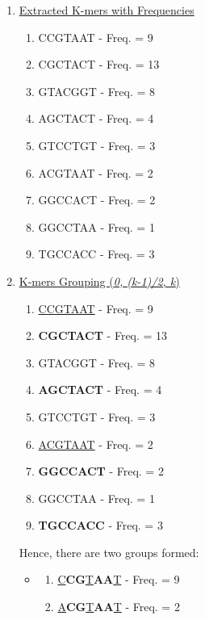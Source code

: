\documentclass[12pt,openany]{llncs}
\begin{document}
\begin{figure}
\vspace{0cm}
\begin{bordered}
\begin{enumerate}
	\item \underline{Extracted K-mers with Frequencies}
	\begin{enumerate}
		\item CCGTAAT - Freq. = 9
		\item CGCTACT - Freq. = 13
		\item GTACGGT - Freq. = 8
		\item AGCTACT - Freq. = 4
		\item GTCCTGT - Freq. = 3
		\item ACGTAAT - Freq. = 2
		\item GGCCACT - Freq. = 2
		\item GGCCTAA - Freq. = 1
		\item TGCCACC - Freq. = 3
	\end{enumerate}
	\item \underline{K-mers Grouping (\textit{0, (k-1)/2, k})}
	  \begin{enumerate}
		\item \underline{CCGTAAT} \hspace{1.8ex}- Freq. = 9
		\item \textbf{CGCTACT} - Freq. = 13
		\item GTACGGT \hspace{1.8ex}- Freq. = 8
		\item \textbf{AGCTACT} - Freq. = 4
		\item GTCCTGT \hspace{1.8ex}- Freq. = 3
		\item \underline{ACGTAAT} \hspace{1.8ex}- Freq. = 2
		\item \textbf{GGCCACT} - Freq. = 2
		\item GGCCTAA \hspace{1.8ex}- Freq. = 1
		\item \textbf{TGCCACC} - Freq. = 3
	  \end{enumerate}
	  Hence, there are two groups formed:
	\begin{itemize}
	  \item 
	  \begin{enumerate}
		\item \underline{C}\textbf{CG}\underline{T}\textbf{AA}\underline{T} - Freq. = 9
		\item \underline{A}\textbf{CG}\underline{T}\textbf{AA}\underline{T} - Freq. = 2

\end{enumerate}
\end{itemize}
\end{enumerate}
\end{bordered}
\end{figure}
\end{document}
